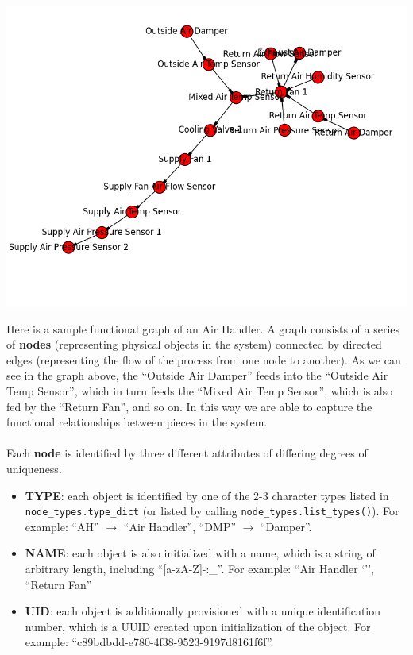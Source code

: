\begin{center}
\includegraphics[scale=.6]{out.png}
\end{center}
Here is a sample functional graph of an Air Handler. A graph consists of a series of {\bf nodes} (representing physical objects in the system) connected by directed edges (representing the flow of the process from one node to another). As we can see in the graph above, the ``Outside Air Damper'' feeds into the ``Outside Air Temp Sensor'', which in turn feeds the ``Mixed Air Temp Sensor'', which is also fed by the ``Return Fan'', and so on. In this way we are able to capture the functional relationships between pieces in the system.
\\\\
Each {\bf node} is identified by three different attributes of differing degrees of uniqueness.
\begin{itemize}
	\item {\bf TYPE}: each object is identified by one of the 2-3 character types listed in \verb+node_types.type_dict+ (or listed by calling \verb+node_types.list_types()+). For example: ``AH'' $\rightarrow$ ``Air Handler'', ``DMP'' $\rightarrow$ ``Damper''.
	
	\item {\bf NAME}: each object is also initialized with a name, which is a string of arbitrary length, including ``[a-zA-Z]-:\_''. For example: ``Air Handler `'', ``Return Fan''
	
	\item {\bf UID}: each object is additionally provisioned with a unique identification number, which is a UUID created upon initialization of the object. For example: ``c89bdbdd-e780-4f38-9523-9197d8161f6f''.
\end{itemize}

